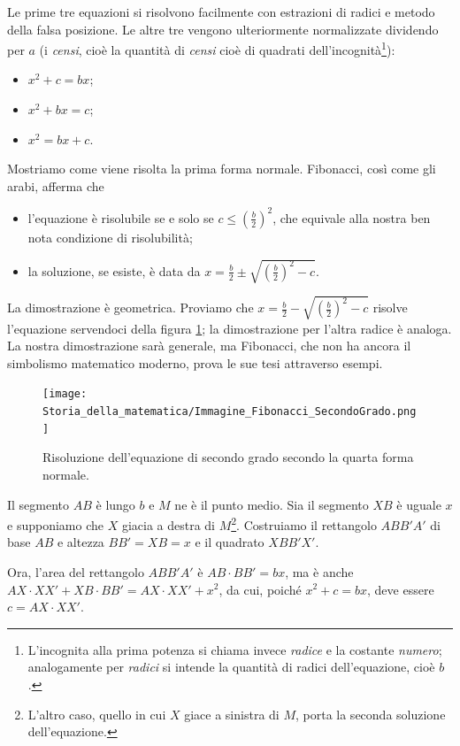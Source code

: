 \par Le prime tre equazioni si risolvono facilmente con estrazioni di radici e metodo della falsa posizione. Le altre tre vengono ulteriormente normalizzate dividendo per $a$ (i \textit{censi}, cio\`e la quantit\`a di \textit{censi} cio\`e di quadrati dell'incognit\`a\footnote{L'incognita alla prima potenza si chiama invece \textit{radice} e la costante \textit{numero}; analogamente per \textit{radici} si intende la quantit\`a di radici dell'equazione, cio\`e $b$.}):
\begin{itemize}
	\item $x^2 + c = bx$;
	\item $x^2 + bx = c$;
	\item $x^2 = bx + c$.
\end{itemize}
\par Mostriamo come viene risolta la prima forma normale. Fibonacci, cos\`i come gli arabi, afferma che 
\begin{itemize}
	\item l'equazione \`e risolubile se e solo se $c \leq \left ( \frac{b}{2} \right )^2$, che equivale alla nostra ben nota condizione di risolubilit\`a;
	\item la soluzione, se esiste, \`e data da $x = \frac{b}{2} \pm \sqrt{ \left ( \frac{b}{2} \right )^2 - c}$.
\end{itemize}
\par La dimostrazione \`e geometrica. Proviamo che $x = \frac{b}{2} - \sqrt{ \left ( \frac{b}{2} \right )^2 - c}$ risolve l'equazione servendoci della figura \ref{Fibonacci_SecondoGrado}; la dimostrazione per l'altra radice \`e analoga. La nostra dimostrazione sar\`a generale, ma Fibonacci, che non ha ancora il simbolismo matematico moderno, prova le sue tesi attraverso esempi.
\begin{figure}
	\texttt{[image: Storia\_della\_matematica/Immagine\_Fibonacci\_SecondoGrado.png]}
	\caption{Risoluzione dell'equazione di secondo grado secondo la quarta forma normale.}
	\label{Fibonacci_SecondoGrado}
\end{figure}
\par Il segmento $AB$ \`e lungo $b$ e $M$ ne \`e il punto medio. Sia il segmento $XB$ \`e uguale $x$ e supponiamo che $X$ giacia a destra di $M$\footnote{L'altro caso, quello in cui $X$ giace a sinistra di $M$, porta la seconda soluzione dell'equazione.}. Costruiamo il rettangolo $ABB'A'$ di base $AB$ e altezza $BB' = XB = x$ e il quadrato $XBB'X'$.
\par Ora, l'area del rettangolo $ABB'A'$ \`e $AB \cdot BB' = bx$, ma \`e anche $AX \cdot XX' + XB \cdot BB' = AX \cdot XX' + x^2$, da cui, poich\'e $x^2 + c = bx$, deve essere $c = AX \cdot XX'$.
